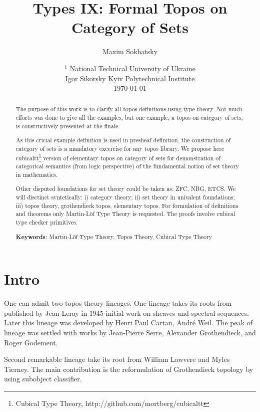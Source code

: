 \documentclass{article}
\theoremstyle{definition}
\begin{document}
\title{Types IX: Formal Topos on Category of Sets}
\author{Maxim Sokhatsky}
\date{
    $^1$ National Technical University of Ukraine \\
    \small Igor Sikorsky Kyiv Polytechnical Institute\\
    \today
}

\maketitle

\begin{abstract}

The purpose of this work is to clarify all topos definitions using type theory.
Not much efforts was done to give all the examples, but one example, a topos
on category of sets, is constructively presented at the finale.

As this cricial example definition is used in presheaf definition,
the construction of category of sets is a mandatory excercise for any topos library.
We propose here cubicaltt\footnote{Cubical Type Theory, http://github.com/mortberg/cubicaltt}
version of elementary topos on category of sets for demonstration of categorical
semantics (from logic perspective) of the fundamental notion of set theory in mathematics.

Other disputed foundations for set theory could be taken as:
ZFC, NBG, ETCS. We will disctinct syntetically: i) category theory;
ii) set theory in univalent foundations; iii) topos theory, grothendieck topos,
elementary topos. For formulation of definitions and theorems only Martin-Löf
Type Theory is requested. The proofs involve cubical type checker primitives.

{\bf Keywords}: Martin-Löf Type Theory, Topos Theory, Cubical Type Theory
\end{abstract}
\tableofcontents
\newpage

\section*{Intro}

One can admit two topos theory lineages. One lineage takes its roots from published
by Jean Leray in 1945 initial work on sheaves and spectral sequences. Later this lineage
was developed by Henri Paul Cartan, André Weil. The peak of lineage was settled
with works by Jean-Pierre Serre, Alexander Grothendieck, and Roger Godement.

Second remarkable lineage take its root from William Lawvere and
Myles Tierney. The main contribution is the reformulation of Grothendieck topology
by using subobject classifier.
\end{document}
